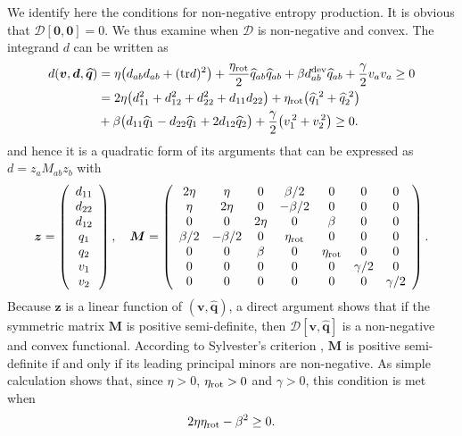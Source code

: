 \documentclass[12pt]{iopart}
\begin{document}
			We identify here the conditions for non-negative entropy production. It is obvious that $\mathcal{D}\left[\bm{0},\bm{0}\right]=0$. We thus examine when $\mathcal{D}$ is non-negative and convex. The integrand $d$ can be written as 
			\begin{eqnarray}
				d(\bm{v},\bm{d},\widehat{\bm{q}}) &  = \eta \big( d_{ab} d_{ab}   + (\text{tr}d)^2  \big) + \frac{\eta_{\text{rot}}}{2} \widehat{q}_{ab} \widehat{q}_{ab}  + \beta d_{ab}^{\rm dev}\widehat{q}_{ab} + \frac{\gamma}{2} v_a v_a \geq 0  \nonumber\\ 
				& = 2\eta \big( d_{11}^2 + d_{12}^2 + d_{22}^2  + d_{11}d_{22} \big) + \eta_{\text{rot}} \big( \widehat{q}_{1}^{\, \, 2} + \widehat{q}_{2}^{\, \, 2}  \big)  \\ 
				&  + \beta \big(d_{11}\widehat{q}_{1} - d_{22}\widehat{q}_{1} + \nonumber  2d_{12}\widehat{q}_{2}\big) +  \nonumber  \frac{\gamma}{2} \big(v_1^{\,2} + v_2^{\,2}\big) \geq 0 .
			\end{eqnarray}
			and hence it is a quadratic form of its arguments that can be expressed as $d = z_{a} M_{ab} z_b$ with 
			\begin{equation}
				\bm{z} = \left(\begin{array}{c}
					d_{11}\\ 
					d_{22}\\ 
					d_{12}\\ 
					q_{1}\\ 
					q_{2}\\ 
					v_1\\ 
					v_2\\ 
				\end{array}\right), \quad  \bm{M} = \left(\begin{array}{ccccccc}
					2\eta& \eta &0  &\beta/2  &0  &0  &0   \\ 
					\eta& 2\eta &0  &-\beta/2  &0  &0  &0   \\ 
					0&  0&  2\eta&  0& \beta &0  &0   \\ 
					\beta/2& -\beta/2 &0  &\eta_{\rm rot}  &0  &0  &0   \\ 
					0&  0 &\beta  & 0 & \eta_{\rm rot} &0  &0   \\ 
					0& 0 & 0 & 0 & 0 & \gamma/2 & 0  \\ 
					0& 0 & 0 & 0 & 0 & 0 & \gamma/2
				\end{array}\right).
			\end{equation}
			Because $\bm{z}$ is a linear function of $\left(\bm{v},\widehat{\bm{q}}\right)$, a direct argument shows that if the symmetric matrix $\bm{M}$ is positive semi-definite, then $\mathcal{D}\left[\bm{v},\widehat{\bm{q}}\right]$ is a non-negative and convex functional. According to Sylvester's criterion \cite{doi:10.1080/00029890.1991.11995702}, $\bm{M}$ is positive semi-definite if and only if its leading principal minors are non-negative. As simple calculation shows that, since $\eta>0$, $\eta_{\rm rot}>0$ and $\gamma>0$, this condition is met when
			\begin{equation}
				2\eta \eta_{\rm rot} - \beta^2 \geq 0.
			\end{equation}
			
\end{document}
